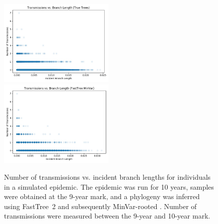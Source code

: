 \begin{figure} %
\centering
\includegraphics[width=0.495\textwidth]{figs/proact-trans-vs-bl-true}
\includegraphics[width=0.495\textwidth]{figs/proact-trans-vs-bl-ftmv}
\caption[Number of Transmissions vs. Incident Branch Length]
{Number of transmissions vs. incident branch lengths for individuals in a simulated epidemic. The epidemic was run for 10 years, samples were obtained at the 9-year mark, and a phylogeny was inferred using FastTree~2 \cite{Price2010} and subsequently MinVar-rooted \cite{Mai2017}. Number of transmissions were measured between the 9-year and 10-year mark.}
\label{fig:proact-trans-vs-bl}
\end{figure}

